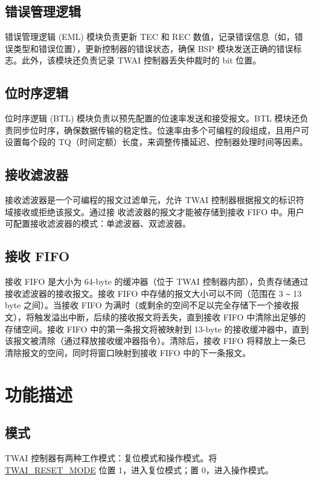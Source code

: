 \documentclass[main\_\_CN.tex]{subfiles}
\begin{document}
\subsection{错误管理逻辑}
错误管理逻辑 (EML) 模块负责更新 TEC 和 REC 数值，记录错误信息（如，错误类型和错误位置），更新控制器的错误状态，确保 BSP 模块发送正确的错误标志。此外，该模块还负责记录 TWAI 控制器丢失仲裁时的 bit 位置。

\subsection{位时序逻辑}
位时序逻辑 (BTL) 模块负责以预先配置的位速率发送和接受报文。BTL 模块还负责同步位时序，确保数据传输的稳定性。位速率由多个可编程的段组成，且用户可设置每个段的 TQ（时间定额）长度，来调整传播延迟、控制器处理时间等因素。

\subsection{接收滤波器}
接收滤波器是一个可编程的报文过滤单元，允许 TWAI 控制器根据报文的标识符域接收或拒绝该报文。通过接
收滤波器的报文才能被存储到接收 FIFO 中。用户可配置接收滤波器的模式：单滤波器、双滤波器。

\subsection{接收 FIFO}
接收 FIFO 是大小为 64-byte 的缓冲器（位于 TWAI 控制器内部），负责存储通过接收滤波器的接收报文。接收 FIFO 中存储的报文大小可以不同（范围在 3 \verb+~+ 13 byte 之间）。当接收 FIFO 为满时（或剩余的空间不足以完全存储下一个接收报文），将触发溢出中断，后续的接收报文将丢失，直到接收 FIFO 中清除出足够的存储空间。接收 FIFO 中的第一条报文将被映射到 13-byte 的接收缓冲器中，直到该报文被清除（通过释放接收缓冲器指令）。清除后，接收 FIFO 将释放上一条已清除报文的空间，同时将窗口映射到接收 FIFO 中的下一条报文。

\section{功能描述}

\subsection{模式}
\label{sec:twai-modes}
\chipname{} TWAI 控制器有两种工作模式：复位模式和操作模式。将 \hyperref[fielddesc:TWAIRESETMODE]{TWAI\_RESET\_MODE} 位置 1，进入复位模式；置 0，进入操作模式。
\end{document}
